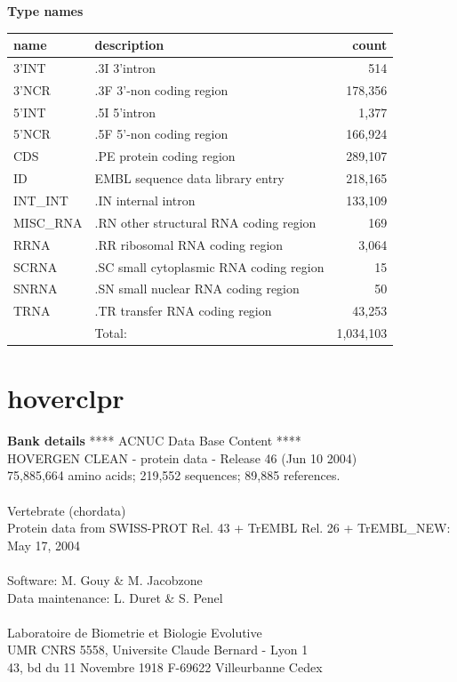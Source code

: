 \documentclass{article}
\begin{document}
\begin{Schunk}
\textbf{Type names}
\noindent\begin{tabular}{llr}
\hline \hline
name & description & count \\
\hline
3'INT  &  .3I 3'intron  &  514 \\
3'NCR  &  .3F  3'-non coding region  &  178,356 \\
5'INT  &  .5I 5'intron  &  1,377 \\
5'NCR  &  .5F  5'-non coding region  &  166,924 \\
CDS  &  .PE protein coding region  &  289,107 \\
ID  &  EMBL sequence data library entry  &  218,165 \\
INT\_INT  &  .IN  internal intron  &  133,109 \\
MISC\_RNA  &  .RN other structural RNA coding region  &  169 \\
RRNA  &  .RR ribosomal RNA coding region  &  3,064 \\
SCRNA  &  .SC small cytoplasmic RNA coding region  &  15 \\
SNRNA  &  .SN small nuclear RNA coding region  &  50 \\
TRNA  &  .TR transfer RNA coding region  &  43,253 \\
\hline
 & Total: & 1,034,103 \\
\hline \hline
\end{tabular}

\section{ hoverclpr }
\textbf{Bank details}
               ****     ACNUC Data Base Content      ****                       \\
          HOVERGEN CLEAN - protein data - Release 46 (Jun 10 2004)\\
          75,885,664 amino acids; 219,552 sequences; 89,885 references.\\
\\
                       Vertebrate (chordata)	  \\
Protein data from SWISS-PROT Rel. 43  + TrEMBL Rel. 26 + TrEMBL\_NEW: May 17, 2004\\
\\
Software: M. Gouy \& M. Jacobzone\\
Data maintenance: L. Duret \& S. Penel\\
\\
Laboratoire de Biometrie et Biologie Evolutive\\
UMR CNRS 5558, Universite Claude Bernard - Lyon 1 \\
43, bd du 11 Novembre 1918 F-69622 Villeurbanne Cedex\\



\end{Schunk}
\end{document}
